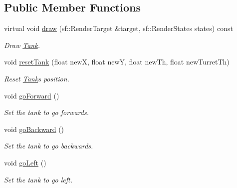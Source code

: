 \subsection*{Public Member Functions}
\begin{DoxyCompactItemize}
\item 
\mbox{\label{class_tank_a83ff27f2cff5926c8c970751084af8f7}} 
virtual void \mbox{\hyperlink{class_tank_a83ff27f2cff5926c8c970751084af8f7}{draw}} (sf\+::\+Render\+Target \&target, sf\+::\+Render\+States states) const
\begin{DoxyCompactList}\small\item\em Draw \mbox{\hyperlink{class_tank}{Tank}}. \end{DoxyCompactList}\item 
\mbox{\label{class_tank_a2cf1b4e5397bf54df4906e8c3f91a554}} 
void \mbox{\hyperlink{class_tank_a2cf1b4e5397bf54df4906e8c3f91a554}{reset\+Tank}} (float newX, float newY, float new\+Th, float new\+Turret\+Th)
\begin{DoxyCompactList}\small\item\em Reset \mbox{\hyperlink{class_tank}{Tank}}\textquotesingle{}s position. \end{DoxyCompactList}\item 
\mbox{\label{class_tank_a12273b8cb5c553dbe2d86ee1901e7724}} 
void \mbox{\hyperlink{class_tank_a12273b8cb5c553dbe2d86ee1901e7724}{go\+Forward}} ()
\begin{DoxyCompactList}\small\item\em Set the tank to go forwards. \end{DoxyCompactList}\item 
\mbox{\label{class_tank_aa051fc7515586360ab4f92f48a0ac320}} 
void \mbox{\hyperlink{class_tank_aa051fc7515586360ab4f92f48a0ac320}{go\+Backward}} ()
\begin{DoxyCompactList}\small\item\em Set the tank to go backwards. \end{DoxyCompactList}\item 
\mbox{\label{class_tank_a216e88194fedd737d9382e31adbe032c}} 
void \mbox{\hyperlink{class_tank_a216e88194fedd737d9382e31adbe032c}{go\+Left}} ()
\begin{DoxyCompactList}\small\item\em Set the tank to go left. \end{DoxyCompactList}\item 

\end{DoxyCompactItemize}
